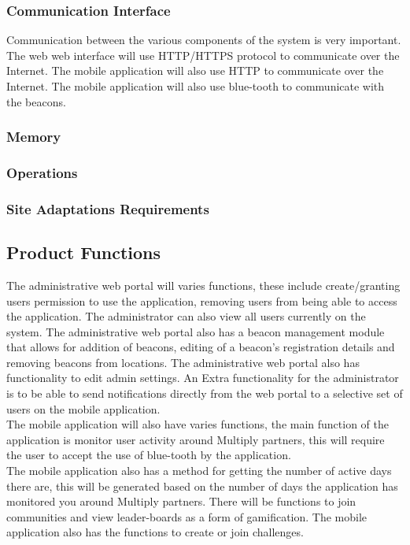 \documentclass[11pt]{article}
\begin{document}
\subsubsection{Communication Interface}
Communication between the various components of the system is very important. The web web interface will use HTTP/HTTPS protocol to communicate over the Internet. The mobile application will also use HTTP to communicate over the Internet. The mobile  application will also use blue-tooth to communicate with the beacons.
\subsubsection{Memory}
\subsubsection{Operations}
\subsubsection{Site Adaptations Requirements}
\subsection{Product Functions}
The administrative web portal will varies functions, these include create/granting users permission to use the application, removing users from being able to access the application. The administrator can also view all users currently on the system. The administrative web portal also has a beacon management module that allows for addition of beacons, editing of a beacon's registration details and removing beacons from locations.  The administrative web portal also has functionality to edit admin settings. An Extra functionality for the administrator is to be able to send notifications directly from the web portal to a selective set of users on the mobile application. \\
The mobile application will also have varies functions, the main function of the application is monitor user activity around Multiply partners, this will require the user to accept the use of blue-tooth by the application. \\  
The mobile application also has a method for getting the number of active days there are, this will be generated based on the number of days the application has monitored you around Multiply partners.  There will be functions to join communities and view leader-boards as a form of gamification. The mobile application also has the functions to create or join challenges.  
\end{document}
